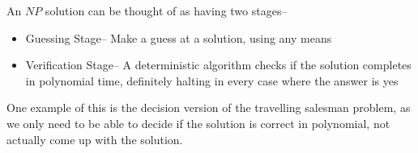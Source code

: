 An $NP$ solution can be thought of as having two stages--
\begin{itemize}
  \item Guessing Stage-- Make a guess at a solution, using any means
  \item Verification Stage-- A deterministic algorithm checks if the solution completes in polynomial time, definitely
   halting in every case where the answer is yes
\end{itemize}

One example of this is the decision version of the travelling salesman problem, as we only need to be able to decide if
 the solution is correct in polynomial, not actually come up with the solution.